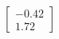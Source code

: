 \documentclass[preview]{standalone}
\begin{document}
\begin{align*}
\begin{bmatrix} -0.42 \\ 1.72 \end{bmatrix}
\end{align*}
\end{document}
